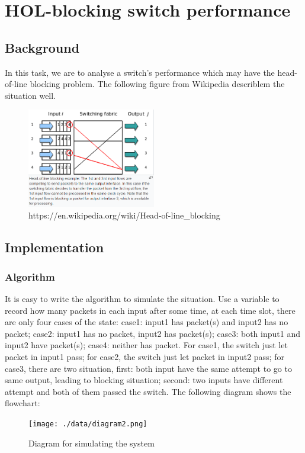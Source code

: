 \documentclass[twoside]{article}
\begin{document}
\section{HOL-blocking switch performance}
\subsection{\normalsize{Background}}
In this task, we are to analyse a switch's performance which may have the head-of-line blocking problem. The following figure from Wikipedia describlem the situation well.
\begin{figure}[H]
   \centering
   \includegraphics[width = 0.5\textwidth]{./data/HOLblocking.png}  
   \caption{https://en.wikipedia.org/wiki/Head-of-line\_blocking}
\end{figure}
\subsection{\normalsize{Implementation}}
\subsubsection{Algorithm}
It is easy to write the algorithm to simulate the situation. Use a variable to record how many packets in each input after some time, at each time slot, there are only four cases of the state: case1: input1 has packet(s) and input2 has no packet; case2: input1 has no packet, input2 has packet(s); case3: both input1 and input2 have packet(s); case4: neither has packet. For case1, the switch just let packet in input1 pass; for case2, the switch just let packet in input2 pass; for case3, there are two situation, first: both input have the same attempt to go to same output, leading to blocking situation; second: two inputs have different attempt and both of them passed the switch. The following diagram shows the flowchart:
\begin{figure}[H]
   \centering
   \texttt{[image: ./data/diagram2.png]}  
   \caption{Diagram for simulating the system}
\end{figure}
\end{document}
